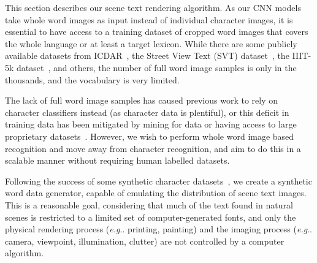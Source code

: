 \documentclass[twocolumn]{svjour3}          \smartqed  \usepackage{epsfig}
\makeatletter
\DeclareRobustCommand\onedot{\futurelet\@let@token\@onedot}
\def\@onedot{\ifx\@let@token.\else.\null\fi\xspace}
\def\eg{\emph{e.g}\onedot} \def\Eg{\emph{E.g}\onedot}
\makeatother
\begin{document}
This section describes our scene text rendering algorithm. As our CNN models take whole word images as input instead of individual character images, it is essential to have access to a training dataset of cropped word images that covers the whole language or at least a target lexicon. While there are some publicly available datasets from ICDAR~\cite{ICDAR03, ICDAR2005, ICDAR11, ICDAR2013}, the Street View Text (SVT) dataset~\cite{Wang11}, the IIIT-5k dataset~\cite{Mishra12}, and others, the number of full word image samples is only in the thousands, and the vocabulary is very limited. 

The lack of full word image samples has caused previous work to rely on character classifiers instead (as character data is plentiful), or this deficit in training data has been mitigated by mining for data or having access to large proprietary datasets~\cite{Jaderberg14a,Bissacco13,Goodfellow13}. However, we wish to perform whole word image based recognition and move away from character recognition, and aim to do this in a scalable manner without requiring human labelled datasets.

Following the success of some synthetic character datasets~\cite{Campos09,Wang12}, we create a synthetic word data generator, capable of emulating the distribution of scene text images. This is a reasonable goal, considering that much of the text found in natural scenes is restricted to a limited set of computer-generated fonts, and only the physical rendering process (\eg printing, painting) and the imaging process (\eg camera, viewpoint, illumination, clutter) are not controlled by a computer algorithm. 
\end{document}
